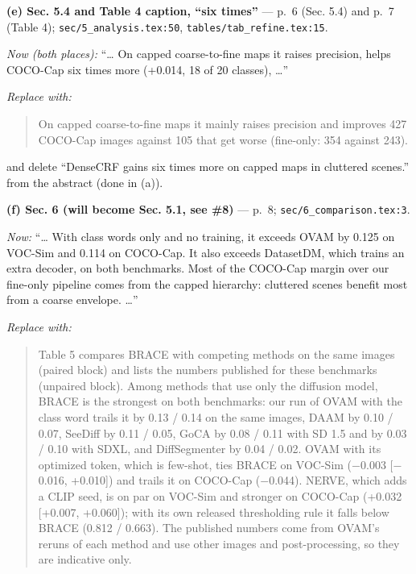 \documentclass[
  10pt,
]{article}
\begin{document}
\textbf{(e) Sec. 5.4 and Table 4 caption, ``six times''} --- p.~6 (Sec.
5.4) and p.~7 (Table 4); \texttt{sec/5\_analysis.tex:50},
\texttt{tables/tab\_refine.tex:15}.

\emph{Now (both places):} ``\ldots{} On capped coarse-to-fine maps it
raises precision, helps COCO-Cap six times more (+0.014, 18 of 20
classes), \ldots{}''

\emph{Replace with:}

\begin{quote}
On capped coarse-to-fine maps it mainly raises precision and improves
427 COCO-Cap images against 105 that get worse (fine-only: 354 against
243).
\end{quote}

and delete ``DenseCRF gains six times more on capped maps in cluttered
scenes.'' from the abstract (done in (a)).

\textbf{(f) Sec. 6 (will become Sec. 5.1, see \#8)} --- p.~8;
\texttt{sec/6\_comparison.tex:3}.

\emph{Now:} ``\ldots{} With class words only and no training, it exceeds
OVAM by 0.125 on VOC-Sim and 0.114 on COCO-Cap. It also exceeds
DatasetDM, which trains an extra decoder, on both benchmarks. Most of
the COCO-Cap margin over our fine-only pipeline comes from the capped
hierarchy: cluttered scenes benefit most from a coarse envelope.
\ldots{}''

\emph{Replace with:}

\begin{quote}
Table 5 compares BRACE with competing methods on the same images (paired
block) and lists the numbers published for these benchmarks (unpaired
block). Among methods that use only the diffusion model, BRACE is the
strongest on both benchmarks: our run of OVAM with the class word trails
it by 0.13 / 0.14 on the same images, DAAM by 0.10 / 0.07, SeeDiff by
0.11 / 0.05, GoCA by 0.08 / 0.11 with SD 1.5 and by 0.03 / 0.10 with
SDXL, and DiffSegmenter by 0.04 / 0.02. OVAM with its optimized token,
which is few-shot, ties BRACE on VOC-Sim (\ensuremath{-}0.003 {[}\ensuremath{-}0.016, +0.010{]})
and trails it on COCO-Cap (\ensuremath{-}0.044). NERVE, which adds a CLIP seed, is on
par on VOC-Sim and stronger on COCO-Cap (+0.032 {[}+0.007, +0.060{]});
with its own released thresholding rule it falls below BRACE (0.812 /
0.663). The published numbers come from OVAM's reruns of each method and
use other images and post-processing, so they are indicative only.
\end{quote}
\end{document}
